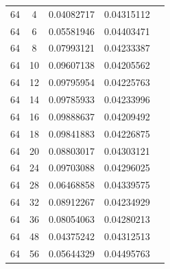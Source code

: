 \documentclass[letterpaper,12pt]{article}
\theoremstyle{remark}
\begin{document}
\begin{tabular}{ccccc}
64 & 4 & 0.04082717 & 0.04315112 \\
64 & 6 & 0.05581946 & 0.04403471 \\
64 & 8 & 0.07993121 & 0.04233387 \\
64 & 10 & 0.09607138 & 0.04205562 \\
64 & 12 & 0.09795954 & 0.04225763 \\
64 & 14 & 0.09785933 & 0.04233996 \\
64 & 16 & 0.09888637 & 0.04209492 \\
64 & 18 & 0.09841883 & 0.04226875 \\
64 & 20 & 0.08803017 & 0.04303121 \\
64 & 24 & 0.09703088 & 0.04296025 \\
64 & 28 & 0.06468858 & 0.04339575 \\
64 & 32 & 0.08912267 & 0.04234929 \\
64 & 36 & 0.08054063 & 0.04280213 \\
64 & 48 & 0.04375242 & 0.04312513 \\
64 & 56 & 0.05644329 & 0.04495763 \\
\end{tabular}
\end{document}
